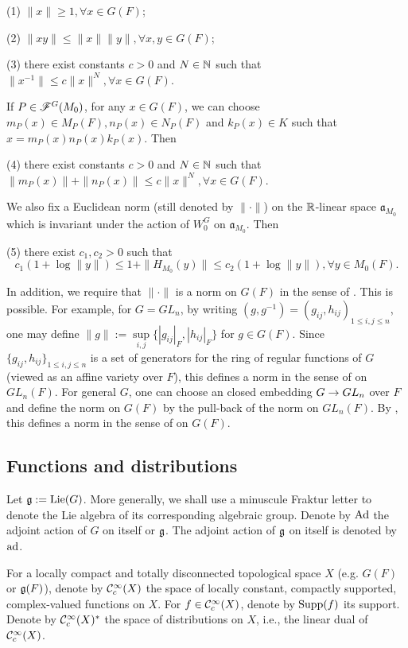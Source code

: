 \documentclass[a4paper]{amsart}
\newcommand{\fa}{{\mathfrak{a}}} \newcommand{\fb}{{\mathfrak{b}}}\newcommand{\fc}{{\mathfrak{c}}} \newcommand{\fd}{{\mathfrak{d}}}
\newcommand{\alg}{{\mathrm{alg}}}                    \newcommand{\Alb}{{\mathrm{Alb}}}            \newcommand{\an}{{\mathrm{an}}}
\newcommand{\Lie}{{\mathrm{Lie}}}                    \newcommand{\LL}[1]{L^\alg(E^{(#1)}, 1)}       \newcommand{\Mp}{{\mathrm{Mp}}}
\theoremstyle{definition}
\theoremstyle{remark}
\numberwithin{equation}{subsection}
\begin{document}
(1) $\|x\|\geq 1, \forall x\in G(F)$; 

(2) $\|xy\|\leq \|x\| \|y\|, \forall x, y\in G(F)$; 

(3) there exist constants $c>0$ and $N\in{\mathbb {N}}$ such that $\|x^{-1}\|\leq c \|x\|^N, \forall x\in G(F)$. 

If $P\in\mathscr{F}^G(M_0)$, for any $x\in G(F)$, we can choose $m_P(x)\in M_P(F), n_P(x)\in N_P(F)$ and $k_P(x)\in K$ such that $x=m_P(x)n_P(x)k_P(x)$. Then

(4) there exist constants $c>0$ and $N\in{\mathbb {N}}$ such that $\|m_P(x)\| + \|n_P(x)\| \leq c \|x\|^N, \forall x\in G(F)$. 

We also fix a Euclidean norm (still denoted by $\|\cdot\|$) on the ${\mathbb {R}}$-linear space $\fa_{M_0}$ which is invariant under the action of $W_0^G$ on $\fa_{M_0}$. Then

(5) there exist $c_1,c_2>0$ such that
$$ c_1(1+\log\|y\|) \leq 1+\|H_{M_0}(y)\| \leq c_2(1+\log\|y\|), \forall y\in M_0(F). $$

In addition, we require that $\|\cdot\|$ is a norm on $G(F)$ in the sense of \cite[\S18.2]{MR2192014}. This is possible. For example, for $G=GL_n$, by writing $(g,g^{-1})=(g_{ij},h_{ij})_{1\leq i,j\leq n}$, one may define $\|g\|:=\sup\limits_{i,j} \{|g_{ij}|_F, |h_{ij}|_F\}$ for $g\in G(F)$. Since $\{g_{ij},h_{ij}\}_{1\leq i,j\leq n}$ is a set of generators for the ring of regular functions of $G$ (viewed as an affine variety over $F$), this defines a norm in the sense of \cite[\S18.2]{MR2192014} on $GL_n(F)$. For general $G$, one can choose an closed embedding $G\rightarrow GL_n$ over $F$ and define the norm on $G(F)$ by the pull-back of the norm on $GL_n(F)$. By \cite[Proposition 18.1.(2)]{MR2192014}, this defines a norm in the sense of \cite[\S18.2]{MR2192014} on $G(F)$. 

\subsection{Functions and distributions}
Let $\fg:=\Lie(G)$. More generally, we shall use a minuscule Fraktur letter to denote the Lie algebra of its corresponding algebraic group. Denote by ${\mathrm{Ad}}$ the adjoint action of $G$ on itself or ${\mathfrak{g}}$. The adjoint action of ${\mathfrak{g}}$ on itself is denoted by ${\mathrm{ad}}$. 

For a locally compact and totally disconnected topological space $X$ (e.g. $G(F)$ or ${\mathfrak{g}}(F)$), denote by ${\mathcal {C}}_c^\infty(X)$ the space of locally constant, compactly supported, complex-valued functions on $X$. For $f\in{\mathcal {C}}_c^\infty(X)$, denote by ${\mathrm{Supp}}(f)$ its support. Denote by ${\mathcal {C}}_c^\infty(X)^\ast$ the space of distributions on $X$, i.e., the linear dual of ${\mathcal {C}}_c^\infty(X)$. 
\end{document}
